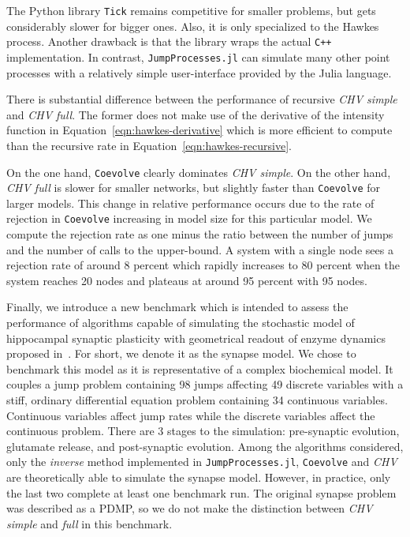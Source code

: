 \documentclass{juliacon}
\numberwithin{equation}{section}
\begin{document}
The Python library \texttt{Tick} remains competitive for smaller problems, but gets considerably slower for bigger ones. Also, it is only specialized to the Hawkes process. Another drawback is that the library wraps the actual \texttt{C++} implementation. In contrast, \texttt{JumpProcesses.jl} can simulate many other point processes with a relatively simple user-interface provided by the Julia language.

There is substantial difference between the performance of recursive \textit{CHV simple} and \textit{CHV full}. The former does not make use of the derivative of the intensity function in Equation~\ref{eqn:hawkes-derivative} which is more efficient to compute than the recursive rate in Equation~\ref{eqn:hawkes-recursive}.

On the one hand, \texttt{Coevolve} clearly dominates \textit{CHV simple}. On the other hand, \textit{CHV full} is slower for smaller networks, but slightly faster than \texttt{Coevolve} for larger models. This change in relative performance occurs due to the rate of rejection in \texttt{Coevolve} increasing in model size for this particular model. We compute the rejection rate as one minus the ratio between the number of jumps and the number of calls to the upper-bound. A system with a single node sees a rejection rate of around 8 percent which rapidly increases to 80 percent when the system reaches 20 nodes and plateaus at around 95 percent with 95 nodes.

Finally, we introduce a new benchmark which is intended to assess the performance of algorithms capable of simulating the stochastic model of hippocampal synaptic plasticity with geometrical readout of enzyme dynamics proposed in~\cite{rodrigues2021}. For short, we denote it as the synapse model. We chose to benchmark this model as it is representative of a complex biochemical model. It couples a jump problem containing 98 jumps affecting 49 discrete variables with a stiff, ordinary differential equation problem containing 34 continuous variables. Continuous variables affect jump rates while the discrete variables affect the continuous problem. There are 3 stages to the simulation: pre-synaptic evolution, glutamate release, and post-synaptic evolution. Among the algorithms considered, only the \textit{inverse} method implemented in \texttt{JumpProcesses.jl}, \texttt{Coevolve} and \textit{CHV} are theoretically able to simulate the synapse model. However, in practice, only the last two complete at least one benchmark run. The original synapse problem was described as a PDMP, so we do not make the distinction between \textit{CHV simple} and \textit{full} in this benchmark.
\end{document}
